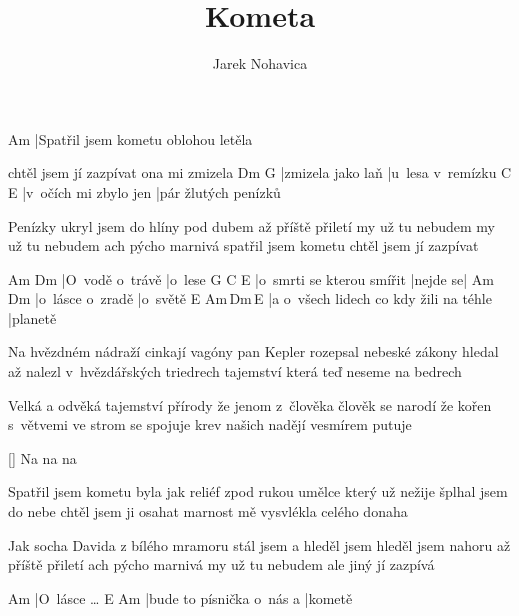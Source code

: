 \documentclass{song}
\title{Kometa}
\author{Jarek Nohavica}
\begin{document}
\strophe
Am
|Spatřil jsem kometu oblohou letěla

chtěl jsem jí zazpívat ona mi zmizela
Dm                G\7
|zmizela jako laň |u~lesa v~remízku
C                     E\7
|v~očích mi zbylo jen |pár žlutých penízků
\endstrophe

\strophe*
Penízky ukryl jsem do hlíny pod dubem
až příště přiletí my už tu nebudem
my už tu nebudem ach pýcho marnivá
spatřil jsem kometu chtěl jsem jí zazpívat
\endstrophe

Am              Dm
|O~vodě o~trávě |o~lese
G\7                       C        E\7
|o~smrti se kterou smířit |nejde se|
Am               Dm
|o~lásce o~zradě |o~světě
E\7                                    Am\,Dm\,E\7
|a o~všech lidech co kdy žili na téhle |planetě
\endstrophe

\strophe*
Na hvězdném nádraží cinkají vagóny
pan Kepler rozepsal nebeské zákony
hledal až nalezl v~hvězdářských triedrech
tajemství která teď neseme na bedrech
\endstrophe

\strophe*
Velká a odvěká tajemství přírody
že jenom z~člověka člověk se narodí
že kořen s~větvemi ve strom se spojuje
krev našich nadějí vesmírem putuje
\endstrophe

\ref{} Na na na

\strophe*
Spatřil jsem kometu byla jak reliéf
zpod rukou umělce který už nežije
šplhal jsem do nebe chtěl jsem ji osahat
marnost mě vysvlékla celého donaha
\endstrophe

\strophe*
Jak socha Davida z bílého mramoru
stál jsem a hleděl jsem hleděl jsem nahoru
až příště přiletí ach pýcho marnivá
my už tu nebudem ale jiný jí zazpívá
\endstrophe

Am
|O~lásce \ldots{}
E\7                       Am
|bude to písnička o~nás a |kometě
\endstrophe
\end{document}
